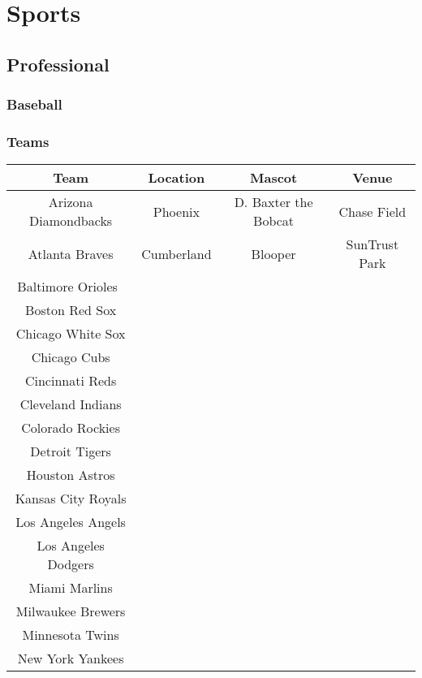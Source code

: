 \documentclass[12pt]{book}
\begin{document}
\chapter{Sports}
	\section{Professional}
		\newpage
		\subsection{Baseball}
			\subsection{Teams}
			\begin{center}
				
				\begin{tabular}{|c|c|c|c|}
					\hline
					\textbf{Team} & \textbf{Location} & \textbf{Mascot} & \textbf{Venue} \\
					\hline
					Arizona Diamondbacks	& Phoenix & D. Baxter the Bobcat &Chase Field	\\
					\hline
					Atlanta Braves	& Cumberland & Blooper & SunTrust Park	\\
					\hline
					Baltimore Orioles 	& & &	\\
					\hline
					Boston Red Sox	& & &	\\
					\hline
					Chicago White Sox	& & &	\\
					\hline
					Chicago Cubs	& & &	\\
					\hline
					Cincinnati Reds	& & &	\\
					\hline
					Cleveland Indians	& & &	\\
					\hline
					Colorado Rockies	& & &	\\
					\hline
					Detroit Tigers	& & &	\\
					\hline
					Houston Astros	& & &	\\
					\hline
					Kansas City Royals	& & &	\\
					\hline
					Los Angeles Angels	& & &	\\
					\hline
					Los Angeles Dodgers	& & &	\\
					\hline
					Miami Marlins	& & &	\\
					\hline
					Milwaukee Brewers	& & &	\\
					\hline
					Minnesota Twins	& & &	\\
					\hline
					New York Yankees	& & &	\\

\end{tabular}
\end{center}
\end{document}
